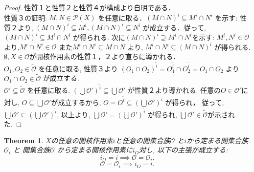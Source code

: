 \documentclass[lualatex]{ltjsbook}
\newtheorem{theorem}{Theorem}[section]
\theoremstyle{remark}
\theoremstyle{plain}
\begin{document}
\begin{proof}
	性質１と性質２と性質４が構成より自明である．\\
	性質３の証明: $M , N \in \mathcal{P}(X)$ を任意に取る．$\left( M \cap N \right) ^{i} \subseteq M^{i} \cap N^{i}$ を示す: 性質２より, $\left( M \cap N \right)^{i} \subseteq M^{i}, \left( M \cap N \right) ^{i} \subseteq N^{i} $ が成立する．従って, $\left( M \cap  N \right) ^{i } \subseteq M^{i} \cap  N^{i}$ 
	が得られる. 次に$(M\cap N)^{i} \supseteq M^{i}  \cap  N ^{i}$を示す: $M^{i} , N^{i} \in \mathcal{O}$より,$ M^{i} \cap  N^{ i} \in \mathcal{O}$ また$M^{i} \cap N^{i} \subseteq M \cap N$ より, $M^{i} \cap N^{i} \subseteq \left( M \cap N \right) ^{i}$ が得られる.\\
	$\emptyset , X \in \tilde{\mathcal{O}}$が開核作用素の性質１，２より直ちに導かれる．\\
	$O_1, O_2 \in \tilde{\mathcal{O}}$ を任意に取る, 性質３より
	$(O_1 \cap O_2)^{\tilde{i}} = O_1 ^{\tilde{i}} \cap O_2^{\tilde{i}} = O_1 \cap O_2$ より $O_1 \cap O_2 \in \tilde{\mathcal{O}}$ が成立する.\\
	$\mathcal{O}' \subseteq \tilde{\mathcal{O}}$ を任意に取る. 
	$\left(\bigcup \mathcal{O}' \right) ^{\tilde{i}} \subseteq \bigcup \mathcal{O}'  $ が性質２より導かれる. 
	任意の$O \in \mathcal{O}'$に対し, $O \subseteq \bigcup \mathcal{O}' $が成立するから, 
	$O = O^{\tilde{i}} \subseteq  \left(\bigcup \mathcal{O}'\right) ^{\tilde{i}}$ が得られ，
	従って, $\bigcup \mathcal{O}' \subseteq \left(\bigcup \mathcal{O}' \right)^{\tilde{i}}  $,
	以上より, $\bigcup \mathcal{O}' = \left( \bigcup \mathcal{O}'  \right) ^{\tilde{i}}$ が得られ, 
	$\bigcup \mathcal{O}' \in \tilde{\mathcal{O}}$が示された.
\end{proof}

\begin{theorem}
	$X$の任意の開核作用素$i$と任意の開集合族$\mathcal{O}$ 
	と$i$から定まる開集合族 $\mathcal{O}_i$ と
	開集合族$\mathcal{O}$ から定まる開核作用素に$i_O$対し, 以下の主張が成立する:
	\[
	i_O = i \implies \mathcal{O} = \mathcal{O}_i
	.\] 
	\[
	\mathcal{O} = \mathcal{O}_i \implies i_O = i
	.\] 
\end{theorem}
\end{document}
